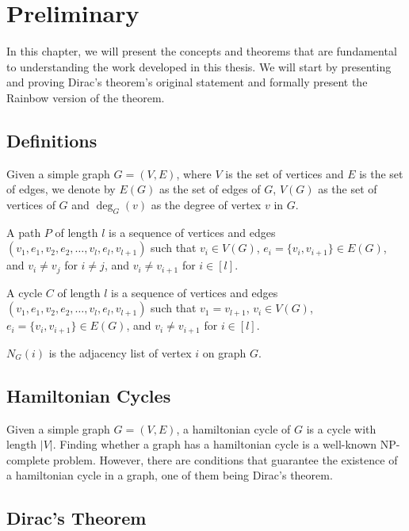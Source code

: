 
\chapter{Preliminary}

In this chapter, we will present the concepts and theorems that are fundamental to understanding the 
work developed in this thesis. We will start by presenting and proving Dirac's theorem's original
statement and formally present the Rainbow version of the theorem.

\section{Definitions}

Given a simple graph $G = (V, E)$, where $V$ is the set of vertices and $E$ is the set of edges, we denote by $E(G)$ as
the set of edges of $G$, $V(G)$ as the set of vertices of $G$ and $\deg_G(v)$ as the degree of vertex $v$ in $G$.

A path $P$ of length $l$ is a sequence of vertices and edges $(v_1, e_1, v_2, e_2, \ldots, v_{l}, e_{l}, v_{l + 1})$ such that
$v_i \in V(G)$, $e_i = \{v_i, v_{i + 1}\} \in E(G)$, and $v_i \neq v_j$ for $i \neq j$, and $v_i \neq v_{i+1}$ for $i \in [l]$.

A cycle $C$ of length $l$ is a sequence of vertices and edges $(v_1, e_1, v_2, e_2, \ldots, v_{l}, e_{l}, v_{l + 1})$ such that
$v_{1} = v_{l + 1}$, $v_i \in V(G)$, $e_i = \{v_i, v_{i + 1}\} \in E(G)$, and $v_i \neq v_{i+1}$ for $i \in [l]$.

$N_G(i)$ is the adjacency list of vertex $i$ on graph $G$.

\section{Hamiltonian Cycles}

Given a simple graph $G = (V, E)$, a hamiltonian cycle of $G$ is a cycle with length $|V|$.
Finding whether a graph has a hamiltonian cycle is a well-known NP-complete problem. 
However, there are conditions that guarantee the existence of a hamiltonian cycle in a graph, one of them being Dirac's theorem.

\section{Dirac's Theorem}

